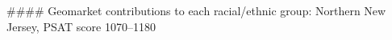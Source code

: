 #### Geomarket contributions to each racial/ethnic group: Northern New Jersey, PSAT score 1070–1180
